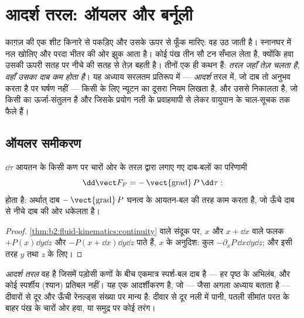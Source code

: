 \chapter{आदर्श तरल: ऑयलर और बर्नूली}\label{ch:b2:euler-bernoulli}

काग़ज़ की एक शीट किनारे से पकड़िए और उसके ऊपर से फूँक मारिए: वह उठ जाती
है। स्नानघर में नल खोलिए और परदा भीतर की ओर झुक आता है। कोई पंख तीन
सौ टन सँभाल लेता है, क्योंकि हवा उसकी ऊपरी सतह पर नीचे की सतह से तेज़
बहती है। तीनों एक ही कथन हैं: \emph{तरल जहाँ तेज़
चलता है, वहाँ उसका दाब कम होता है}। यह अध्याय सरलतम प्रतिरूप में ---
\emph{आदर्श} तरल में, जो दाब तो अनुभव करता है पर घर्षण नहीं --- किसी
 के लिए न्यूटन का दूसरा नियम लिखता है, और उससे 
निकालता है, जो किसी  का ऊर्जा-संतुलन है और जिसके प्रयोग नली के
प्रवाहमापी से लेकर वायुयान के चाल-सूचक तक फैले हैं।

\section{ऑयलर समीकरण}

\begin{proposition}[किसी तरल कण पर दाब-बल]\label{prop:b2:euler-bernoulli:pressure}
$\dd\tau$ आयतन के किसी कण पर चारों ओर के तरल द्वारा लगाए गए
दाब-बलों का परिणामी
\[
\dd\vect F_P = -\operatorname{\vect{grad}}P\,\dd\tau :
\]
होता है: अर्थात् दाब $-\operatorname{\vect{grad}}P$ घनत्व के आयतन-बल की
तरह काम करता है, जो ऊँचे दाब से नीचे दाब की ओर धकेलता है।
\end{proposition}

\begin{proof}
\cref{thm:b2:fluid-kinematics:continuity} वाले संदूक पर,
$x$ और $x + \dd x$ वाले फलक $+P(x)\dd y\dd z$ और $-P(x + \dd x)\dd y\dd z$
पाते हैं, $x$ के अनुदिश: कुल $-\partial_xP\,\dd x\dd y\dd z$; और इसी तरह $y$ तथा $z$ के लिए।
\end{proof}

\begin{definition}\label{def:b2:euler-bernoulli:perfect}
\emph{आदर्श तरल} वह है जिसमें पड़ोसी कणों के बीच एकमात्र स्पर्श-बल
दाब है --- हर पृष्ठ के अभिलंब, और कोई स्पर्शीय (श्यान) प्रतिबल नहीं।
यह एक आदर्शीकरण है, जो --- जैसा अगला अध्याय बताता है --- दीवारों से दूर
और ऊँची रेनल्ड्स संख्या पर मान्य है: दीवार से दूर नली में पानी, पतली
सीमांत परत के बाहर पंख के चारों ओर हवा, या समुद्र पर कोई तरंग।
\end{definition}

